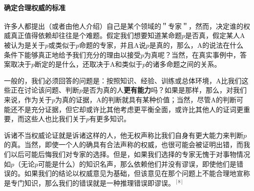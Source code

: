 \paragraph{确定合理权威的标准}
许多人都提出（或者由他人介绍）自己是某个领域的＂专家＂，然而，决定谁的权威真正值得依赖却往往是个难题。假定我们想要知道某命题$p$是否真，假定某人A被认为是关于$p$或类似于$p$命题的专家，并且A说$p$是真的，那么，A的说法在什么条件下能够真正地给予我们充分的理由以接受$p$为真呢？当然，在真实事例中，答案取决于$p$断定的是什么，还取决于A和类似于$p$的诸多命题之间的关系。

一般的，我们必须回答的问题是：按照知识、经验、训练或总体环境，A比我们这些正在讨论该问题、判断$p$是否为真的人\textbf{更有能力}吗？如果是那样，那么，对我们来说，作为关于$p$为真的证据，A的判断就具有某种价值；当然，尽管A的判断可能还不是充分证据，但它却或许比其他考虑更平衡全面，或许比其他人的证词更重要，而这些人也比我们关于$p$有更多知识。

诉诸不当权威论证就是诉诸这样的人，他无权声称比我们自身有更大能力来判断$p$的真。当然，即使一个人的确具有合法声称的权威，也很可能会被证明出错，而我们以后可能后悔我们对专家的选择。但是，如果我们选择的专家无愧于对事物情况如$p$（无论$p$可能是什么）的知识名声，那么依赖他们并没有谬误，即使他们是错误的。如果我们的结论以权威意见为基础，但该意见在那个问题上不能合理地宣称是专门知识，那么我们的错误就是一种推理错误即谬误。${ }^{[8]}$ 